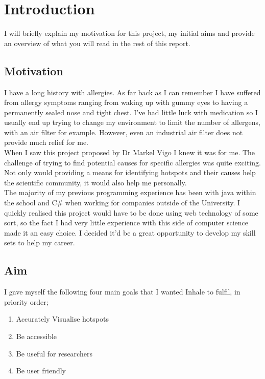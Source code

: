 \chapter{Introduction}
\label{cha:intro}

I will briefly explain my motivation for this project, my initial aims and provide an overview of what you will read in the rest of this report.

\section{Motivation} 
I have a long history with allergies. As far back as I can remember I have suffered from allergy symptoms ranging from waking up with gummy eyes to having a permanently sealed nose and tight chest. I've had little luck with medication so I usually end up trying to change my environment to limit the number of allergens, with an air filter for example. However, even an industrial air filter does not provide much relief for me.\\

When I saw this project proposed by Dr Markel Vigo I knew it was for me. The challenge of trying to find potential causes for specific allergies was quite exciting. Not only would providing a means for identifying hotspots and their causes help the scientific community, it would also help me personally.\\

The majority of my previous programming experience has been with java within the school and C\# when working for companies outside of the University. I quickly realised this project would have to be done using web technology of some sort, so the fact I had very little experience with this side of computer science made it an easy choice. I decided it'd be a great opportunity to develop my skill sets to help my career.\\

\section{Aim}
\label{sec:aim}

I gave myself the following four main goals that I wanted Inhale to fulfil, in priority order;

\begin{enumerate}
  \item Accurately Visualise hotspots
  \item Be accessible
  \item Be useful for researchers
  \item Be user friendly
\end{enumerate}


